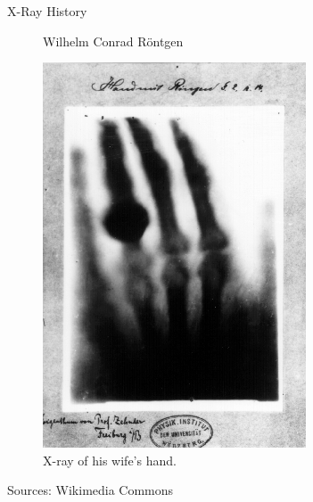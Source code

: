 \begin{frame}{X-Ray History}
\begin{figure}[tb]
\begin{minipage}[t]{0.207\columnwidth}
            \caption{Wilhelm Conrad Röntgen}%
            \label{fig_chap:xray_roentgenHead}
        \end{minipage}
        \hspace{3cm}
        \begin{minipage}[t]{0.1998\columnwidth}
            \includegraphics[width=1\columnwidth]{images/EarlyXrayWife}%
            \caption{X-ray of his wife's hand.}%
            \label{fig_chap:xray_roentgenHand}
        \end{minipage}%
    \end{figure}
    \begin{center}
        \vspace{-0.3cm}
        \begin{flushright}
            \scriptsize Sources: Wikimedia Commons
        \end{flushright}
    \end{center}
\end{frame}


